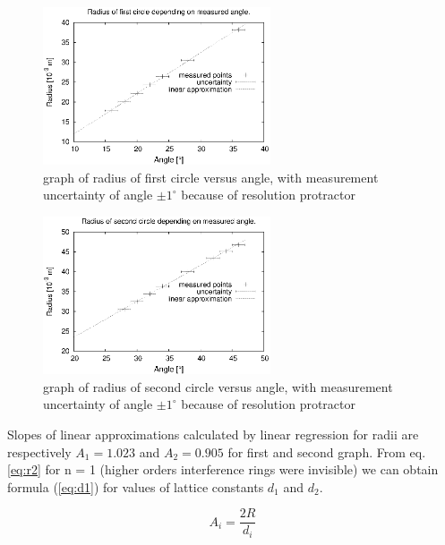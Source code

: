 \documentclass[a4paper,12pt]{article}
\begin{document}
\begin{figure}[H]
    \begin{center}
        \includegraphics[width=0.60\textwidth]{r-ang1}
        \caption{graph of radius of first circle versus angle, with measurement uncertainty of angle $\pm 1^{\circ}$ because of resolution protractor}
        \label{fig:r-ang1}
    \end{center}
\end{figure}

\begin{figure}[H]
    \begin{center}
        \includegraphics[width=0.60\textwidth]{r-ang2}
        \caption{graph of radius of second circle versus angle, with measurement uncertainty of angle $\pm 1^{\circ}$ because of resolution protractor}
        \label{fig:r-ang2}
    \end{center}
\end{figure}

Slopes of linear approximations calculated by linear regression for radii are respectively $A_1 = 1.023$ and $A_2 = 0.905$ for first and second graph. From eq. \ref{eq:r2} for n = 1 (higher orders interference rings were invisible) we can obtain formula (\ref{eq:d1}) for values of lattice constants $d_1$ and $d_2$.

\begin{equation}
    A_i = \frac{2R}{d_i} \label{eq:d1}
\end{equation}
\end{document}
